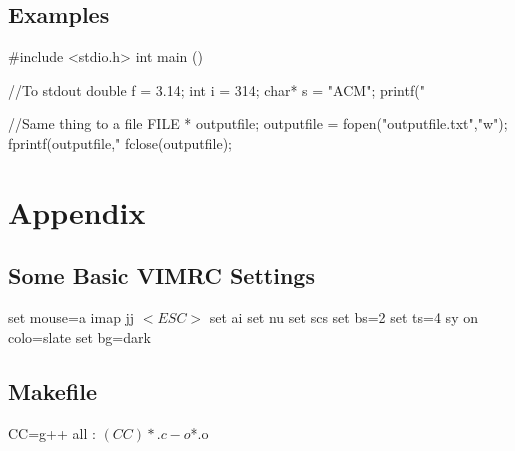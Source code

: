 \documentclass[letterpaper, 10pt]{report}
\begin{document}
\section{Examples}
\begin{code}
    #include <stdio.h>
    int main (){
        //To stdout
        double f = 3.14;
        int    i = 314;
        char*  s = "ACM";
        printf("%

        //Same thing to a file
        FILE * outputfile;
        outputfile = fopen("outputfile.txt","w");
        fprintf(outputfile,"%
        fclose(outputfile);
    }
\end{code}

\chapter{Appendix}
\section{Some Basic VIMRC Settings}
\begin{multicols}{2}
\begin{code}
set mouse=a
imap jj $<ESC>$
set ai
set nu
set scs
set bs=2
set ts=4
sy on
colo=slate
set bg=dark
\end{code}
\end{multicols}

\section{Makefile}
\begin{code}
CC=g++
all :
    $(CC) *.c -o $*.o
\end{code}



\end{document}
